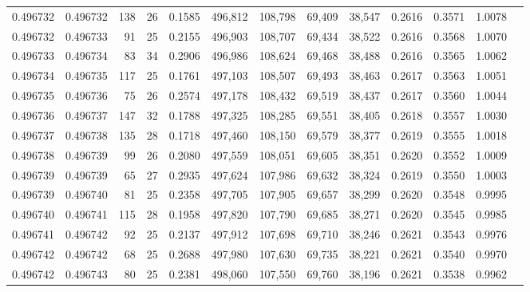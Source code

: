 \begin{tabular}{rrrrrrrrrrrrr}
0.496732 & 0.496732 & 138 &  26 &                                     0.1585 & 496,812 & 108,798 &  69,409 &  38,547 & 0.2616 & 0.3571 & 1.0078 \\
0.496732 & 0.496733 &  91 &  25 &                                     0.2155 & 496,903 & 108,707 &  69,434 &  38,522 & 0.2616 & 0.3568 & 1.0070 \\
0.496733 & 0.496734 &  83 &  34 &                                     0.2906 & 496,986 & 108,624 &  69,468 &  38,488 & 0.2616 & 0.3565 & 1.0062 \\
0.496734 & 0.496735 & 117 &  25 &                                     0.1761 & 497,103 & 108,507 &  69,493 &  38,463 & 0.2617 & 0.3563 & 1.0051 \\
0.496735 & 0.496736 &  75 &  26 &                                     0.2574 & 497,178 & 108,432 &  69,519 &  38,437 & 0.2617 & 0.3560 & 1.0044 \\
0.496736 & 0.496737 & 147 &  32 &                                     0.1788 & 497,325 & 108,285 &  69,551 &  38,405 & 0.2618 & 0.3557 & 1.0030 \\
0.496737 & 0.496738 & 135 &  28 &                                     0.1718 & 497,460 & 108,150 &  69,579 &  38,377 & 0.2619 & 0.3555 & 1.0018 \\
0.496738 & 0.496739 &  99 &  26 &                                     0.2080 & 497,559 & 108,051 &  69,605 &  38,351 & 0.2620 & 0.3552 & 1.0009 \\
0.496739 & 0.496739 &  65 &  27 &                                     0.2935 & 497,624 & 107,986 &  69,632 &  38,324 & 0.2619 & 0.3550 & 1.0003 \\
0.496739 & 0.496740 &  81 &  25 &                                     0.2358 & 497,705 & 107,905 &  69,657 &  38,299 & 0.2620 & 0.3548 & 0.9995 \\
0.496740 & 0.496741 & 115 &  28 &                                     0.1958 & 497,820 & 107,790 &  69,685 &  38,271 & 0.2620 & 0.3545 & 0.9985 \\
0.496741 & 0.496742 &  92 &  25 &                                     0.2137 & 497,912 & 107,698 &  69,710 &  38,246 & 0.2621 & 0.3543 & 0.9976 \\
0.496742 & 0.496742 &  68 &  25 &                                     0.2688 & 497,980 & 107,630 &  69,735 &  38,221 & 0.2621 & 0.3540 & 0.9970 \\
0.496742 & 0.496743 &  80 &  25 &                                     0.2381 & 498,060 & 107,550 &  69,760 &  38,196 & 0.2621 & 0.3538 & 0.9962 \\

\end{tabular}
